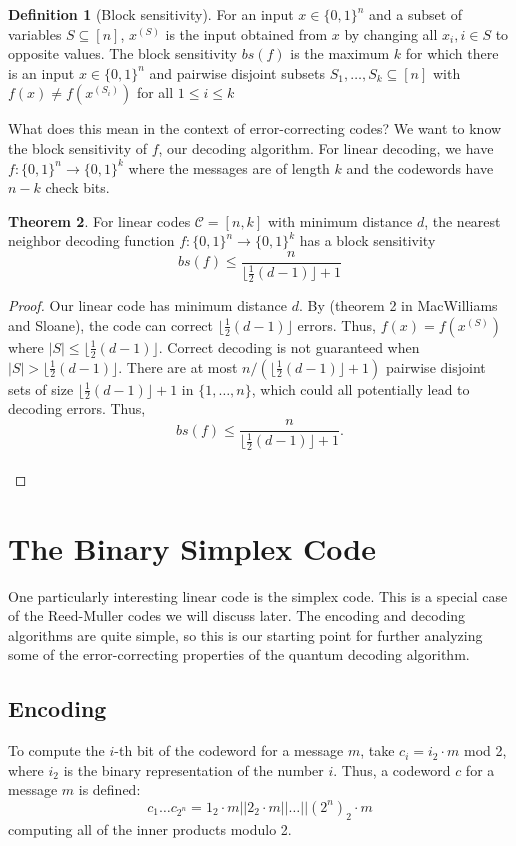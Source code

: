 \documentclass[12pt,twoside]{reedthesis}
\theoremstyle{definition}
\newtheorem{theorem}{Theorem}[chapter]
\newtheorem{definition}[theorem]{Definition}
\begin{document}
\begin{definition}[Block sensitivity] For an input $x\in \{0,1\}^n$ and a subset of variables $S \subseteq [n]$, $x^{(S)}$ is the input obtained from $x$ by changing all $x_i, i \in S$ to opposite values. The block sensitivity $bs(f)$ is the maximum $k$ for which there is an input $x \in \{0,1\}^n$ and pairwise disjoint subsets $S_1, \ldots, S_k \subseteq [n]$ with $f(x) \neq f(x^{(S_i)})$ for all $1 \leq i \leq k$
\end{definition}

What does this mean in the context of error-correcting codes? We want to know the block sensitivity of $f$, our decoding algorithm. For linear decoding, we have $f: \{0,1\}^n \rightarrow \{0,1\}^k$ where the messages are of length $k$ and the codewords have $n-k$ check bits. 

\begin{theorem}
For linear codes $\mathscr{C} = [n,k]$ with minimum distance $d$, the nearest neighbor decoding function $f: \{0,1\}^n \rightarrow \{0,1\}^k$ has a block sensitivity $$
bs(f) \leq \frac{n}{\lfloor \frac{1}{2}(d-1)  \rfloor +1}$$
\end{theorem}

\begin{proof}
Our linear code has minimum distance $d$. By (theorem 2 in MacWilliams and Sloane), the code can correct $\lfloor \frac{1}{2}(d-1) \rfloor$ errors. Thus, $f(x) = f(x^{(S)})$ where $\lvert S \rvert \leq \lfloor \frac{1}{2}(d-1) \rfloor$. Correct decoding is not guaranteed when $\lvert S \rvert > \lfloor \frac{1}{2}(d-1) \rfloor$. There are at most $n/(\lfloor \frac{1}{2}(d-1) \rfloor +1)$ pairwise disjoint sets of size $\lfloor \frac{1}{2}(d-1) \rfloor+ 1$ in $\{1, \ldots, n\}$, which could all potentially lead to decoding errors. Thus, $$bs(f) \leq \frac{n}{\lfloor \frac{1}{2}(d-1)  \rfloor +1}.$$\\
\end{proof}


\chapter{The Binary Simplex Code}
One particularly interesting linear code is the simplex code. This is a special case of the Reed-Muller codes we will discuss later. The encoding and decoding algorithms are quite simple, so this is our starting point for further analyzing some of the error-correcting properties of the quantum decoding algorithm.
\section{Encoding}
To compute the $i$-th bit of the codeword for a message $m$, take $c_i =i_2 \cdot m$ mod 2, where $i_2$ is the binary representation of the number $i$. Thus, a codeword $c$ for a message $m$ is defined: 
\begin{equation*}
c_1 \ldots c_{2^n} = 1_2 \cdot m ||2_2 \cdot m || \ldots ||(2^n)_2 \cdot m
\end{equation*}
computing all of the inner products modulo 2.
\end{document}
